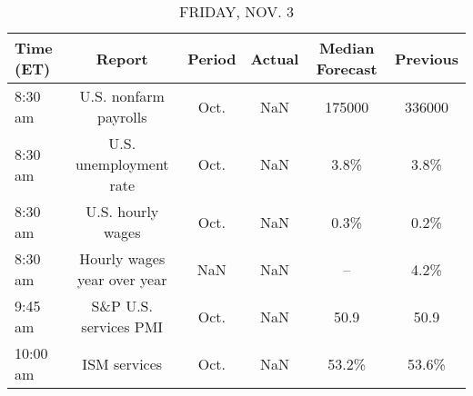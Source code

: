 \documentclass{article}%
\begin{document}
%


\begin{table}[htbp]%
\caption{FRIDAY, NOV. 3}%
\centering%
\begin{adjustbox}{width=1\textwidth}%
\begin{tabular}{lccccc}
\toprule
Time (ET) &                      Report & Period & Actual & Median Forecast & Previous \\
\midrule
  8:30 am &       U.S. nonfarm payrolls &   Oct. &    NaN &          175000 &   336000 \\
  8:30 am &      U.S. unemployment rate &   Oct. &    NaN &            3.8\% &     3.8\% \\
  8:30 am &           U.S. hourly wages &   Oct. &    NaN &            0.3\% &     0.2\% \\
  8:30 am & Hourly wages year over year &    NaN &    NaN &              -- &     4.2\% \\
  9:45 am &       S\&P U.S. services PMI &   Oct. &    NaN &            50.9 &     50.9 \\
 10:00 am &                ISM services &   Oct. &    NaN &           53.2\% &    53.6\% \\
\bottomrule
\end{tabular}
%
\end{adjustbox}%
\end{table}
\end{document}
